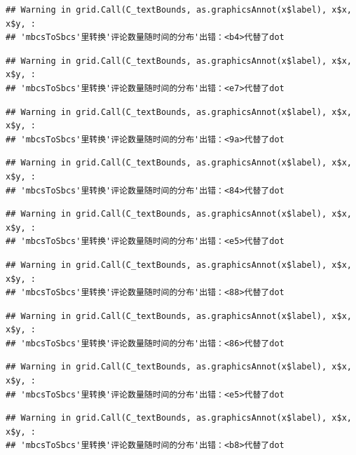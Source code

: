 \documentclass[
]{article}
\begin{document}
\begin{verbatim}
## Warning in grid.Call(C_textBounds, as.graphicsAnnot(x$label), x$x, x$y, :
## 'mbcsToSbcs'里转换'评论数量随时间的分布'出错：<b4>代替了dot
\end{verbatim}

\begin{verbatim}
## Warning in grid.Call(C_textBounds, as.graphicsAnnot(x$label), x$x, x$y, :
## 'mbcsToSbcs'里转换'评论数量随时间的分布'出错：<e7>代替了dot
\end{verbatim}

\begin{verbatim}
## Warning in grid.Call(C_textBounds, as.graphicsAnnot(x$label), x$x, x$y, :
## 'mbcsToSbcs'里转换'评论数量随时间的分布'出错：<9a>代替了dot
\end{verbatim}

\begin{verbatim}
## Warning in grid.Call(C_textBounds, as.graphicsAnnot(x$label), x$x, x$y, :
## 'mbcsToSbcs'里转换'评论数量随时间的分布'出错：<84>代替了dot
\end{verbatim}

\begin{verbatim}
## Warning in grid.Call(C_textBounds, as.graphicsAnnot(x$label), x$x, x$y, :
## 'mbcsToSbcs'里转换'评论数量随时间的分布'出错：<e5>代替了dot
\end{verbatim}

\begin{verbatim}
## Warning in grid.Call(C_textBounds, as.graphicsAnnot(x$label), x$x, x$y, :
## 'mbcsToSbcs'里转换'评论数量随时间的分布'出错：<88>代替了dot
\end{verbatim}

\begin{verbatim}
## Warning in grid.Call(C_textBounds, as.graphicsAnnot(x$label), x$x, x$y, :
## 'mbcsToSbcs'里转换'评论数量随时间的分布'出错：<86>代替了dot
\end{verbatim}

\begin{verbatim}
## Warning in grid.Call(C_textBounds, as.graphicsAnnot(x$label), x$x, x$y, :
## 'mbcsToSbcs'里转换'评论数量随时间的分布'出错：<e5>代替了dot
\end{verbatim}

\begin{verbatim}
## Warning in grid.Call(C_textBounds, as.graphicsAnnot(x$label), x$x, x$y, :
## 'mbcsToSbcs'里转换'评论数量随时间的分布'出错：<b8>代替了dot
\end{verbatim}
\end{document}
